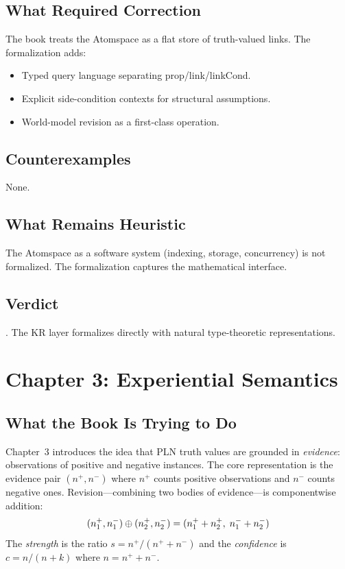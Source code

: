 \documentclass[11pt,openany]{report}
\begin{document}
\section{What Required Correction}

The book treats the Atomspace as a flat store of truth-valued links.
The formalization adds:
\begin{itemize}
\item Typed query language separating prop/link/linkCond.
\item Explicit side-condition contexts for structural assumptions.
\item World-model revision as a first-class operation.
\end{itemize}

\section{Counterexamples}

None.

\section{What Remains Heuristic}

The Atomspace as a software system (indexing, storage, concurrency) is
not formalized.  The formalization captures the mathematical interface.

\section{Verdict}

\verdictClean{}.  The KR layer formalizes directly with natural type-theoretic
representations.


\chapter{Chapter 3: Experiential Semantics}
\label{ch:review-ch3}

\section{What the Book Is Trying to Do}

Chapter~3 introduces the idea that PLN truth values are grounded in
\emph{evidence}: observations of positive and negative instances.
The core representation is the evidence pair $(n^+, n^-)$ where
$n^+$ counts positive observations and $n^-$ counts negative ones.
Revision---combining two bodies of evidence---is componentwise addition:
\[
  (n_1^+, n_1^-) \oplus (n_2^+, n_2^-) = (n_1^+ + n_2^+,\; n_1^- + n_2^-)
\]
The \emph{strength} is the ratio $s = n^+ / (n^+ + n^-)$ and the
\emph{confidence} is $c = n / (n + k)$ where $n = n^+ + n^-$.
\end{document}
